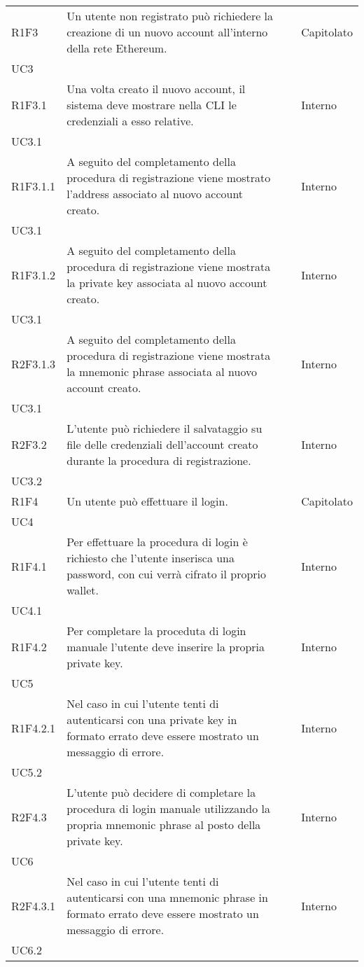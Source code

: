 \begin{longtable}{ 
		>{\centering}p{} 
		>{}p{} 
		>{\centering}p{}
		>{\centering}p{} }
	R1F3 & Un utente non registrato può richiedere la creazione di un nuovo account
			 all'interno della rete Ethereum\ped{\textit{G}}.						& \ob & Capitolato \\ UC3 \tabularnewline
	R1F3.1 & Una volta creato il nuovo account, il sistema deve mostrare nella 
			CLI\ped{\textit{G}} le credenziali a esso relative.										& \ob & Interno \\ UC3.1 \tabularnewline
	R1F3.1.1 & A seguito del completamento della procedura di registrazione viene
			mostrato l'address associato al nuovo account creato. 					& \ob & Interno \\ UC3.1 \tabularnewline
	R1F3.1.2 & A seguito del completamento della procedura di registrazione viene
			mostrata la private key\ped{\textit{G}} associata al nuovo account creato. 				& \ob & Interno \\ UC3.1 \tabularnewline
	R2F3.1.3 & A seguito del completamento della procedura di registrazione viene
			mostrata la mnemonic phrase\ped{\textit{G}} associata al nuovo account creato. 			& \de & Interno \\ UC3.1 \tabularnewline
	R2F3.2 & L'utente può richiedere il salvataggio su file delle credenziali 
			dell'account creato durante la procedura di registrazione.				& \de & Interno \\ UC3.2 \tabularnewline

	R1F4 & Un utente può effettuare il login. 										& \ob & Capitolato \\ UC4 \tabularnewline
	R1F4.1 & Per effettuare la procedura di login è richiesto che l'utente inserisca una 
		password, con cui verrà cifrato il proprio wallet\ped{\textit{G}}. 							& \ob & Interno \\ UC4.1 \tabularnewline
	R1F4.2 & Per completare la proceduta di login manuale l'utente deve inserire
			 la propria private key\ped{\textit{G}}. 								& \ob & Interno \\ UC5 \tabularnewline
	R1F4.2.1 & Nel caso in cui l'utente tenti di autenticarsi con una private key in formato errato 
		deve essere mostrato un messaggio di errore. 								& \ob & Interno \\ UC5.2 \tabularnewline
	R2F4.3 & L'utente può decidere di completare la procedura di login manuale 
			 utilizzando la propria mnemonic phrase\ped{\textit{G}} al posto della private key.		& \de & Interno \\ UC6 \tabularnewline
 	R2F4.3.1 & Nel caso in cui l'utente tenti di autenticarsi con una mnemonic phrase in formato errato 
 	deve essere mostrato un messaggio di errore. 								& \ob & Interno \\ UC6.2 \tabularnewline
	

\end{longtable}
